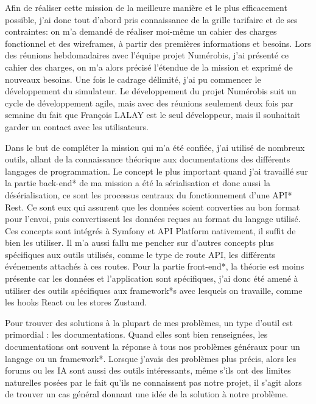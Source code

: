 \documentclass[a4paper,12pt]{report}
\begin{document}
\vspace{1em}

Afin de réaliser cette mission de la meilleure manière et le plus efficacement possible, j'ai donc tout d'abord pris connaissance de la grille tarifaire et de ses contraintes: on m'a demandé de réaliser moi-même un cahier des charges fonctionnel et des wireframes, à partir des premières informations et besoins. Lors des réunions hebdomadaires avec l'équipe projet Numérobis, j'ai présenté ce cahier des charges, on m'a alors précisé l'étendue de la mission et exprimé de nouveaux besoins. Une fois le cadrage délimité, j'ai pu commencer le développement du simulateur. Le développement du projet Numérobis suit un cycle de développement agile, 
mais avec des réunions seulement deux fois par semaine du fait que François LALAY est le seul développeur, mais il souhaitait garder un contact avec les utilisateurs.

\vspace{1em}

Dans le but de compléter la mission qui m'a été confiée, j'ai utilisé de nombreux outils, allant de la connaissance théorique aux documentations des différents langages de programmation. Le concept le plus important quand j'ai travaillé sur la partie back-end* de ma mission a été la sérialisation et donc aussi la désérialisation, ce sont les processus centraux du fonctionnement d'une API* Rest. Ce sont eux qui assurent que les données soient converties au bon format pour l'envoi, puis convertissent les données reçues au format du langage utilisé. Ces concepts sont intégrés à Symfony et API Platform nativement, il suffit de bien les utiliser. Il m'a aussi fallu me pencher sur d'autres concepts plus spécifiques aux outils utilisés, comme le type de route API, les différents événements attachés à ces routes. Pour la partie front-end*, la théorie est moins présente car les données et l'application sont spécifiques, j'ai donc été amené à utiliser des outils spécifiques aux framework*s avec lesquels on travaille, comme les hooks React ou les stores Zustand.

\vspace{1em}

Pour trouver des solutions à la plupart de mes problèmes, un type d'outil est primordial : les documentations. Quand elles sont bien renseignées, les documentations ont souvent la réponse à tous nos problèmes généraux pour un langage ou un framework*. Lorsque j'avais des problèmes plus précis, alors les forums ou les IA sont aussi des outils intéressants, même s'ils ont des limites naturelles posées par le fait qu'ils ne connaissent pas notre projet, il s'agit alors de trouver un cas général donnant une idée de la solution à notre problème.
\end{document}
